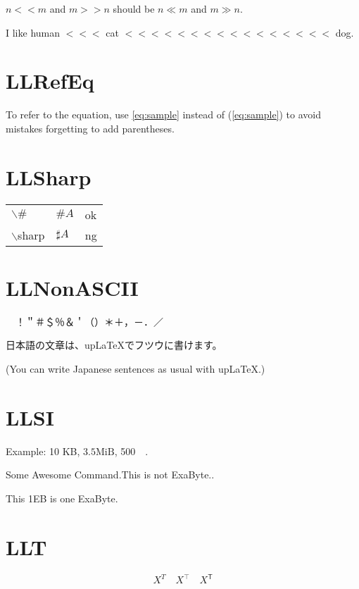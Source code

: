 \documentclass[a4paper, 10pt]{article}
\newcommand{\tA}[1]{\textcolor{cA}{#1}}
\newcommand{\tD}[1]{\textcolor{cD}{#1}}
\begin{document}
$n << m$ and $m >> n$ should be $n \ll m$ and $m \gg n$.

I like human $<<<$ cat $<<<<<<<<<<<<<<<<$ dog.

\section{LLRefEq}

To refer to the equation, use \eqref{eq:sample} instead of (\ref{eq:sample}) to avoid mistakes forgetting to add parentheses.

\section{LLSharp}

\begin{table}[h]
    \centering
    \begin{tabular}{lll}
        $\backslash\#$    & $\#A$      & \tA{ok} \\
        $\backslash$sharp & $\sharp A$ & \tD{ng}
    \end{tabular}
\end{table}

\section{LLNonASCII}

 {　}！＂＃＄％＆＇（）＊＋，－．／

日本語の文章は、upLaTeXでフツウに書けます。

(You can write Japanese sentences as usual with upLaTeX.)

\section{LLSI}

Example: 10 KB, $3.5\mathrm{MiB}$, \SI{500}{\giga\byte}.

\newcommand{\EB}{Some Awesome Command.This is not ExaByte.}

\EB.

This 1EB is one ExaByte.

\section{LLT}

\begin{equation*}
    X^T \quad X^\top \quad X^{\mathsf{T}}
\end{equation*}
\end{document}

